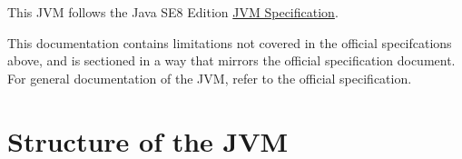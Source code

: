 
\usepackage{titlesec}

\setcounter{secnumdepth}{4}

\newcommand{\Rule}[2]{\genfrac{}{}{0.7pt}{}{{\setlength{\fboxrule}{0pt}\setlength{\fboxsep}{3mm}\fbox{$#1$}}}{{\setlength{\fboxrule}{0pt}\setlength{\fboxsep}{3mm}\fbox{$#2$}}}}

\newcommand{\TruE}{\textbf{\texttt{true}}}
\newcommand{\FalsE}{\textbf{\texttt{false}}}
\newcommand{\AndOp}{\texttt{\&\&}}
\newcommand{\OrOp}{\texttt{||}}
\newcommand{\ThenOp}{\texttt{?}}
\newcommand{\ElseOp}{\texttt{:}}
\newcommand{\Rc}{\texttt{\}}}
\newcommand{\Lc}{\texttt{\{}}
\newcommand{\Rp}{\texttt{)}}
\newcommand{\Lp}{\texttt{(}}
\newcommand{\Fun}{\textbf{\texttt{function}}}
\newcommand{\Let}{\textbf{\texttt{let}}}
\newcommand{\Return}{\textbf{\texttt{return}}}
\newcommand{\Const}{\textbf{\texttt{const}}}
\newcommand{\If}{\textbf{\texttt{if}}}
\newcommand{\Else}{\textbf{\texttt{else}}}
\newcommand{\Bool}{\texttt{boolean}}
\newcommand{\Number}{\texttt{number}}
\newcommand{\String}{\texttt{string}}
\newcommand{\Undefined}{\texttt{undefined}}
\newcommand{\Null}{\texttt{null}}
\newcommand{\Any}{\texttt{any}}
\newcommand{\Void}{\texttt{void}}
\newcommand{\Pred}{\textit{Pred}}
\newcommand{\type}{\textit{type}}
\newcommand{\polytype}{\textit{polytype}}
\newcommand{\predtype}{\textit{predtype}}
\newcommand{\ExtractPos}{\ensuremath{\textit{Extract}^+}}
\newcommand{\ExtractNeg}{\ensuremath{\textit{Extract}^-}}





This JVM follows the Java SE8 Edition \href{https://docs.oracle.com/javase/specs/jvms/se8/html/index.html}{JVM Specification}.

This documentation contains limitations not covered in the official specifcations above, and is sectioned
in a way that mirrors the official specification document. For general documentation of the JVM, refer to the official specification.


\section{Structure of the JVM}

